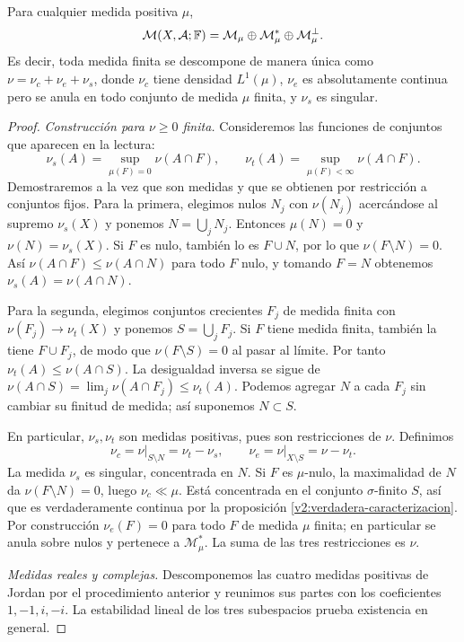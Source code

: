 \begin{teorema}\label{v2:lebesgue-descomposicion}
Para cualquier medida positiva $\mu$,
\[
 \mathcal M(X,\mathcal A;\mathbb F)=\mathcal M_\mu\oplus\mathcal M_\mu^*\oplus\mathcal M_\mu^\perp.
\]
Es decir, toda medida finita se descompone de manera única como $\nu=\nu_c+\nu_e+\nu_s$, donde $\nu_c$ tiene densidad $L^1(\mu)$, $\nu_e$ es absolutamente continua pero se anula en todo conjunto de medida $\mu$ finita, y $\nu_s$ es singular.
\end{teorema}
\begin{proof}
\emph{Construcción para $\nu\ge0$ finita.} Consideremos las funciones de conjuntos que aparecen en la lectura:
\[
 \nu_s(A)=\sup_{\mu(F)=0}\nu(A\cap F),\qquad
 \nu_t(A)=\sup_{\mu(F)<\infty}\nu(A\cap F).
\]
Demostraremos a la vez que son medidas y que se obtienen por restricción a conjuntos fijos. Para la primera, elegimos nulos $N_j$ con $\nu(N_j)$ acercándose al supremo $\nu_s(X)$ y ponemos $N=\bigcup_jN_j$. Entonces $\mu(N)=0$ y $\nu(N)=\nu_s(X)$. Si $F$ es nulo, también lo es $F\cup N$, por lo que $\nu(F\setminus N)=0$. Así $\nu(A\cap F)\le\nu(A\cap N)$ para todo $F$ nulo, y tomando $F=N$ obtenemos $\nu_s(A)=\nu(A\cap N)$.

Para la segunda, elegimos conjuntos crecientes $F_j$ de medida finita con $\nu(F_j)\to\nu_t(X)$ y ponemos $S=\bigcup_jF_j$. Si $F$ tiene medida finita, también la tiene $F\cup F_j$, de modo que $\nu(F\setminus S)=0$ al pasar al límite. Por tanto $\nu_t(A)\le\nu(A\cap S)$. La desigualdad inversa se sigue de $\nu(A\cap S)=\lim_j\nu(A\cap F_j)\le\nu_t(A)$. Podemos agregar $N$ a cada $F_j$ sin cambiar su finitud de medida; así suponemos $N\subset S$.

En particular, $\nu_s,\nu_t$ son medidas positivas, pues son restricciones de $\nu$. Definimos
\[
 \nu_c=\nu\big|_{S\setminus N}=\nu_t-\nu_s,\qquad
 \nu_e=\nu\big|_{X\setminus S}=\nu-\nu_t.
\]
La medida $\nu_s$ es singular, concentrada en $N$. Si $F$ es $\mu$-nulo, la maximalidad de $N$ da $\nu(F\setminus N)=0$, luego $\nu_c\ll\mu$. Está concentrada en el conjunto $\sigma$-finito $S$, así que es verdaderamente continua por la proposición \ref{v2:verdadera-caracterizacion}. Por construcción $\nu_e(F)=0$ para todo $F$ de medida $\mu$ finita; en particular se anula sobre nulos y pertenece a $\mathcal M_\mu^*$. La suma de las tres restricciones es $\nu$.

\emph{Medidas reales y complejas.} Descomponemos las cuatro medidas positivas de Jordan por el procedimiento anterior y reunimos sus partes con los coeficientes $1,-1,i,-i$. La estabilidad lineal de los tres subespacios prueba existencia en general.


\end{proof}
